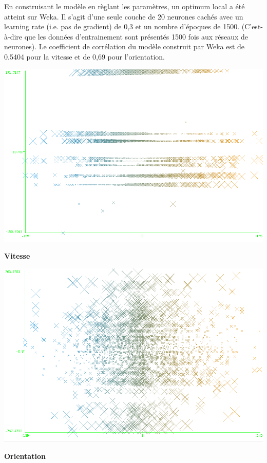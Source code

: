 En construisant le modèle en règlant les paramètres, un optimum local a été atteint sur Weka. Il s'agit d'une seule couche de 20 neurones cachés avec un learning rate (i.e. pas de gradient) de 0,3 et un nombre d'époques de 1500.
(C'est-à-dire que les données d'entrainement sont présentés 1500 fois aux réseaux de neurones).
Le coefficient de corrélation du modèle construit par Weka est de 0.5404 pour la vitesse et de 0,69 pour l'orientation.

\begin{minipage}[c]{\mpwekawidth}
 \includegraphics[width=\textwidth]{../figures/121314SpeedOutputNotNormalized.png}
 \begin{center}
  \textbf{Vitesse}
 \end{center}
\end{minipage}
\begin{minipage}[c]{\mpwekawidth}
 \includegraphics[width=\textwidth]{../figures/HeadNotNormalized.png}
 \begin{center}
  \textbf{Orientation}
 \end{center}
\end{minipage}
\\

